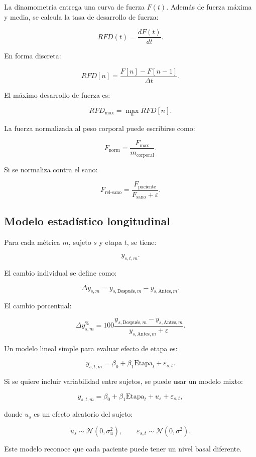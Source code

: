 \documentclass[12pt,a4paper]{article}
\begin{document}
La dinamometría entrega una curva de fuerza \(F(t)\). Además de fuerza máxima y media, se calcula la tasa de desarrollo de fuerza:

\[
RFD(t)
=
\frac{dF(t)}{dt}.
\]

En forma discreta:

\[
RFD[n]
=
\frac{F[n]-F[n-1]}{\Delta t}.
\]

El máximo desarrollo de fuerza es:

\[
RFD_{\max}
=
\max_n RFD[n].
\]

La fuerza normalizada al peso corporal puede escribirse como:

\[
F_{\text{norm}}
=
\frac{F_{\max}}{m_{\text{corporal}}}.
\]

Si se normaliza contra el sano:

\[
F_{\text{rel-sano}}
=
\frac{F_{\text{paciente}}}{F_{\text{sano}}+\varepsilon}.
\]

\subsection{Modelo estadístico longitudinal}

Para cada métrica \(m\), sujeto \(s\) y etapa \(t\), se tiene:

\[
y_{s,t,m}.
\]

El cambio individual se define como:

\[
\Delta y_{s,m}
=
y_{s,\text{Después},m}
-
y_{s,\text{Antes},m}.
\]

El cambio porcentual:

\[
\Delta y_{s,m}^{\%}
=
100
\frac{
y_{s,\text{Después},m}
-
y_{s,\text{Antes},m}
}
{
y_{s,\text{Antes},m}+\varepsilon
}.
\]

Un modelo lineal simple para evaluar efecto de etapa es:

\[
y_{s,t,m}
=
\beta_0
+
\beta_1\text{Etapa}_t
+
\varepsilon_{s,t}.
\]

Si se quiere incluir variabilidad entre sujetos, se puede usar un modelo mixto:

\[
y_{s,t,m}
=
\beta_0
+
\beta_1\text{Etapa}_t
+
u_s
+
\varepsilon_{s,t},
\]

donde \(u_s\) es un efecto aleatorio del sujeto:

\[
u_s\sim \mathcal{N}(0,\sigma_u^2),
\qquad
\varepsilon_{s,t}\sim \mathcal{N}(0,\sigma^2).
\]

Este modelo reconoce que cada paciente puede tener un nivel basal diferente.
\end{document}
